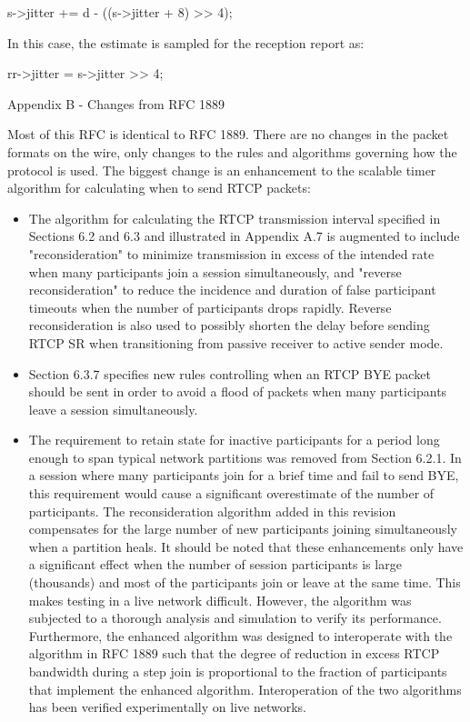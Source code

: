 \documentclass{article}
\begin{document}
s->jitter += d - ((s->jitter + 8) >> 4);

In this case, the estimate is sampled for the reception report as:

rr->jitter = s->jitter >> 4;

Appendix B - Changes from RFC 1889

Most of this RFC is identical to RFC 1889.  There are no changes in the packet formats on the wire, only changes to the rules and algorithms governing how the protocol is used.  The biggest change is an enhancement to the scalable timer algorithm for calculating when to send RTCP packets:

\begin{itemize}
\item The algorithm for calculating the RTCP transmission interval specified in Sections 6.2 and 6.3 and illustrated in Appendix A.7 is augmented to include "reconsideration" to minimize transmission in excess of the intended rate when many participants join a session simultaneously, and "reverse reconsideration" to reduce the incidence and duration of false participant timeouts when the number of participants drops rapidly.  Reverse reconsideration is also used to possibly shorten the delay before sending RTCP SR when transitioning from passive receiver to active sender mode.
\item Section 6.3.7 specifies new rules controlling when an RTCP BYE packet should be sent in order to avoid a flood of packets when many participants leave a session simultaneously.
\item The requirement to retain state for inactive participants for a period long enough to span typical network partitions was removed from Section 6.2.1.  In a session where many participants join for a brief time and fail to send BYE, this requirement would cause a significant overestimate of the number of participants.  The reconsideration algorithm added in this revision compensates for the large number of new participants joining simultaneously when a partition heals.
It should be noted that these enhancements only have a significant effect when the number of session participants is large (thousands) and most of the participants join or leave at the same time.  This makes testing in a live network difficult.  However, the algorithm was subjected to a thorough analysis and simulation to verify its performance.  Furthermore, the enhanced algorithm was designed to interoperate with the algorithm in RFC 1889 such that the degree of reduction in excess RTCP bandwidth during a step join is proportional to the fraction of participants that implement the enhanced algorithm.  Interoperation of the two algorithms has been verified experimentally on live networks.


\end{itemize}
\end{document}
